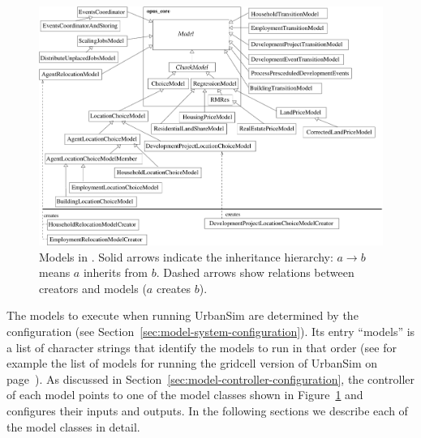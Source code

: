 \begin{figure}[t]
\begin{center}
\includegraphics[scale=0.5]{images/urbansimmodels.pdf}
\caption{\label{fig:urbansim-model}\small Models in . Solid arrows indicate the inheritance hierarchy:
$a \rightarrow b$ means $a$ inherits from $b$. Dashed arrows show relations between creators and models ($a$ creates $b$).}
\end{center}
\end{figure}

The models to execute when running UrbanSim are determined by the configuration
(see Section~\ref{sec:model-system-configuration}). Its entry ``models''  is a
list of character strings that identify the models to run in that order (see for example 
the list of models for running the gridcell version of UrbanSim on page~\pageref{pg:config-models}).
As discussed in Section~\ref{sec:model-controller-configuration}, 
the controller of each model points to one of the model classes shown in Figure~\ref{fig:urbansim-model}
and configures their inputs and outputs. In the following sections we describe each of the model classes in detail. 


